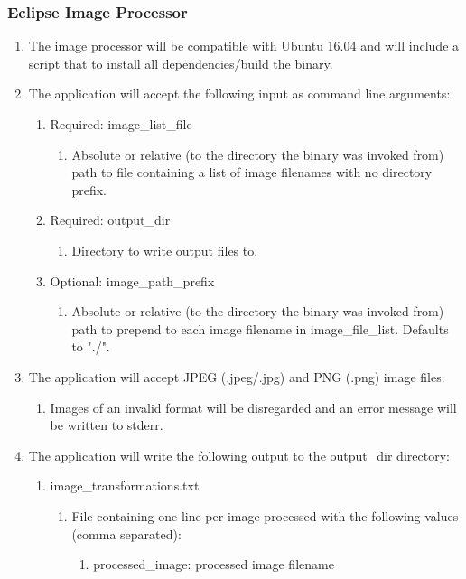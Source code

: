 \documentclass[10pt, onecolumn, draftclsnofoot, letterpaper, compsoc]{IEEEtran}
\begin{document}
\subsubsection{Eclipse Image Processor}
	\begin{enumerate}
		\item The image processor will be compatible with Ubuntu 16.04 and
		 will include a script that to install all dependencies/build the 
		 binary.

		 \item The application will accept the following input as command line
		 arguments:
		 \begin{enumerate}
		 	\item Required: image\_list\_file
		 		\begin{enumerate}
		 			\item Absolute or relative (to the directory the binary was 
		 			invoked from) path to file containing a list of image filenames 
		 			with no directory prefix.
		 		\end{enumerate}

		 	\item Required: output\_dir
		 		\begin{enumerate}
		 			\item Directory to write output files to.
		 		\end{enumerate}

		 	\item Optional: image\_path\_prefix
		 		\begin{enumerate}
		 			\item Absolute or relative (to the directory the binary was
		 			 invoked from) path to prepend to each image filename in 
		 			 image\_file\_list. Defaults to "./".
		 		\end{enumerate}
		 \end{enumerate}

		 \item The application will accept JPEG (.jpeg/.jpg) and PNG (.png) 
		 image files.
		 \begin{enumerate}
		 	\item Images of an invalid format will be disregarded and an error
		 	 message will be written to stderr.
		 \end{enumerate}

		 \item The application will write the following output to the 
		 output\_dir directory:
		 \begin{enumerate}
		 	\item image\_transformations.txt
		 	\begin{enumerate}
		 		\item File containing one line per image processed with the 
		 		following values (comma separated):
		 		\begin{enumerate}
		 			\item processed\_image: processed image filename


\end{enumerate}
\end{enumerate}
\end{enumerate}
\end{enumerate}
\end{document}
